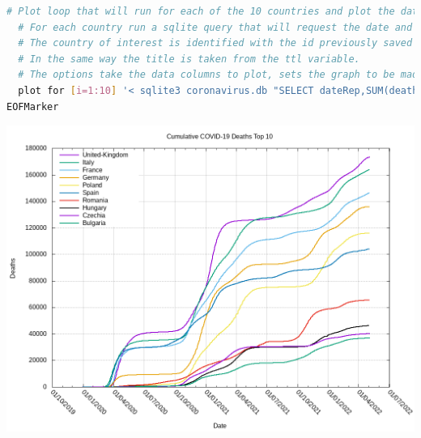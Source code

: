 \documentclass[12pt,oneside,a4paper,english]{article}
\begin{document}
\pagebreak
\begin{lstlisting}[language=Bash, caption=plot.sh script]
  # Plot loop that will run for each of the 10 countries and plot the data on the same graph
  # For each country run a sqlite query that will request the date and the aggregated death like in EX19
  # The country of interest is identified with the id previously saved in the ids variable
  # In the same way the title is taken from the ttl variable.
  # The options take the data columns to plot, sets the graph to be made with lines of width 2.
  plot for [i=1:10] '< sqlite3 coronavirus.db "SELECT dateRep,SUM(deaths) OVER (ROWS UNBOUNDED PRECEDING) FROM CasesAndDeaths INNER JOIN Countries ON country_id=Countries.id INNER JOIN Dates ON date_id=Dates.id WHERE country_id='.word(ids, i).' ORDER BY year,month,day;"' using 1:2 title ttl(i) w l lw 2
EOFMarker
\end{lstlisting}


\includegraphics[width=1\linewidth]{graph.png}
\end{document}

